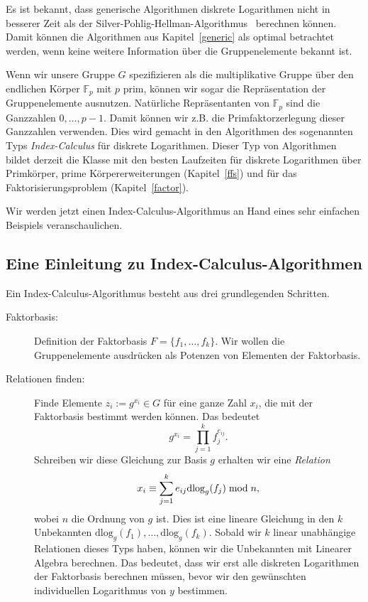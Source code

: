 \begin{refsegment}
Es ist bekannt, dass generische Algorithmen diskrete Logarithmen nicht in besserer Zeit als der Silver-Pohlig-Hellman-Algorithmus~\cite{Shoup1997} berechnen können. Damit können die Algorithmen aus Kapitel~\ref{generic} als optimal betrachtet werden, wenn keine weitere Information über die Gruppenelemente bekannt ist.

Wenn wir unsere Gruppe $G$ spezifizieren als die multiplikative Gruppe über den endlichen Körper $\mathbb{F}_p$ mit $p$ prim, können wir sogar die Repräsentation der Gruppenelemente ausnutzen. Natürliche Repräsentanten von $\mathbb{F}_p$ sind die Ganzzahlen $0, \ldots, p-1$. Damit können wir z.B. die Primfaktorzerlegung dieser Ganzzahlen verwenden. Dies wird gemacht in den Algorithmen des sogenannten Typs {\em Index-Calculus} für diskrete Logarithmen. Dieser Typ von Algorithmen bildet derzeit die Klasse mit den besten Laufzeiten für diskrete Logarithmen über Primkörper, prime Körpererweiterungen (Kapitel~\ref{ffs}) und für das Faktorisierungsproblem (Kapitel~\ref{factor}).

Wir werden jetzt einen Index-Calculus-Algorithmus an Hand eines sehr einfachen Beispiels veranschaulichen.


\subsection{Eine Einleitung zu Index-Calculus-Algorithmen}
\label{simple}
Ein Index-Calculus-Algorithmus besteht aus drei grundlegenden Schritten.

\begin{description}
\item[Faktorbasis:] Definition der Faktorbasis $F=\{f_1, \ldots, f_k\}$. Wir wollen die Gruppenelemente ausdrücken als Potenzen von Elementen der Faktorbasis.

\item[Relationen finden:] Finde Elemente $z_i:=g^{x_i} \in G$ für eine ganze Zahl $x_i$, die mit der Faktorbasis bestimmt werden können. Das bedeutet
$$
  g^{x_i} = \prod_{j=1}^k f_j^{e_{ij}}.
$$
Schreiben wir diese Gleichung zur Basis $g$ erhalten wir eine {\em Relation}
$$
  x_i \equiv \sum_{j=1}^k e_{ij}\textrm{dlog}_g(f_j) \hspace{1mm}{\rm mod}\hspace{1mm} n,
$$
wobei $n$ die Ordnung von $g$ ist. Dies ist eine lineare Gleichung in den $k$ Unbekannten $\textrm{dlog}_g(f_1), \ldots, \textrm{dlog}_g(f_k)$. Sobald wir $k$ linear unabhängige Relationen dieses Typs haben, können wir die Unbekannten mit Linearer Algebra berechnen. Das bedeutet, dass wir erst alle diskreten Logarithmen der Faktorbasis berechnen müssen, bevor wir den gewünschten individuellen Logarithmus von $y$ bestimmen.


\end{description}
\end{refsegment}
